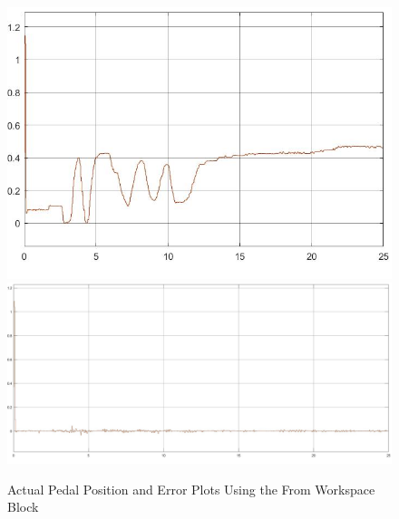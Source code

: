 \documentclass[journal,twoside,web]{ieeecolor}
\begin{document}
\begin{figure}[h]
	\centering
	\subcaptionbox{ \label{brakeWorkspacePedalPosition}}
		{\includegraphics[width=0.48\linewidth]{figs/img/brakeSysActualPedalPositionFromWorkspaceBlocks}}
	\subcaptionbox{ \label{brakeWorkspacePedalError}}
		{\includegraphics[width=0.48\linewidth]{figs/img/brakeSysPedalPositionErrorFromWorkspaceBlocks}}
	\caption{Actual Pedal Position and Error Plots Using the From Workspace Block}
\end{figure}







%

\end{document}
